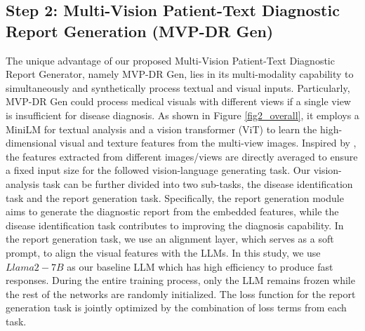 \subsection{Step 2: Multi-Vision Patient-Text Diagnostic Report Generation (MVP-DR Gen)}\label{section_2_3}
The unique advantage of our proposed Multi-Vision Patient-Text Diagnostic Report Generator, namely MVP-DR Gen, lies in its multi-modality capability to simultaneously and synthetically process textual and visual inputs. Particularly, MVP-DR Gen could process medical visuals with different views if a single view is insufficient for disease diagnosis. As shown in Figure \ref{fig2_overall}, it employs a MiniLM \cite{10.5555/3495724.3496209, vergou2023readability} for textual analysis and a vision transformer (ViT) \cite{liu2021swin, yin2022vit, han2022survey} to learn the high-dimensional visual and texture features from the multi-view images. Inspired by \cite{covington2016deep}, the features extracted from different images/views are directly averaged to ensure a fixed input size for the followed vision-language generating task. Our vision-analysis task can be further divided into two sub-tasks, the disease identification task and the report generation task. Specifically, the report generation module aims to generate the diagnostic report from the embedded features, while the disease identification task contributes to improving the diagnosis capability. 
In the report generation task, we use an alignment layer, which serves as a soft prompt, to align the visual features with the LLMs. In this study, we use $Llama2-7B$ \cite{touvron2023llama, thakkar2023comprehensive} as our baseline LLM which has high efficiency to produce fast responses. During the entire training process, only the LLM remains frozen while the rest of the networks are randomly initialized. The loss function for the report generation task is jointly optimized by the combination of loss terms from each task. 

